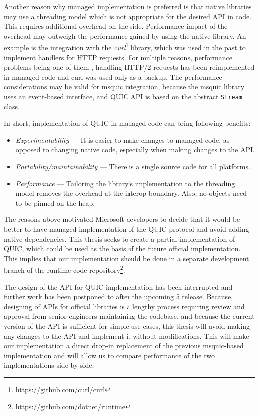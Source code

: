 Another reason why managed implementation is preferred is that native libraries may use a threading
model which is not appropriate for the desired API in \dotnet{} code. This requires additional
overhead on the \dotnet{} side. Performance impact of the overhead may outweigh the performance
gained by using the native library.  An example is the
integration with the \textit{curl}\footnote{https://github.com/curl/curl} library, which was used
in the past to implement handlers for HTTP requests. For multiple reasons, performance problems
being one of them , handling HTTP/2 requests has been
reimplemented in managed code and curl was used only as a backup. The performance considerations may
be valid for msquic integration, because the msquic library uses an event-based interface, and
\dotnet{} QUIC API is based on the abstract \texttt{Stream} class.

In short, implementation of QUIC in managed \dotnet{} code can bring following benefits:

\begin{itemize}
  \item \textit{Experimentability} ---
    It is easier to make changes to managed code, as opposed to changing native code, especially
    when making changes to the API\@.

  \item \textit{Portability/maintainability} ---
    There is a single source code for all platforms.

  \item \textit{Performance} ---
    Tailoring the library's implementation to the \dotnet{} threading model removes the overhead at
    the interop boundary. Also, no objects need to be pinned on the heap.
\end{itemize}

The reasons above motivated Microsoft developers to decide that it would be better to have managed
implementation of the QUIC protocol and avoid adding native dependencies. This thesis seeks to
create a partial implementation of QUIC, which could be used as the basis of the future official
\dotnet{} implementation. This implies that our implementation should be done in a separate
development branch of the  \dotnet{} runtime code
repository\footnote{https://github.com/dotnet/runtime}.

The design of the API for \dotnet{} QUIC implementation has been interrupted and further work has
been postponed to after the upcoming \dotnet{} 5 release. Because, designing of APIs for official
\dotnet{} libraries is a lengthy process requiring review and approval from senior engineers
maintaining the codebase, and because the current version of the API is sufficient for simple use
cases, this thesis will avoid making any changes to the API and implement it without modifications.
This will make our implementation a direct drop-in replacement of the previous msquic-based
implementation and will allow us to compare performance of the two implementations side by side.

